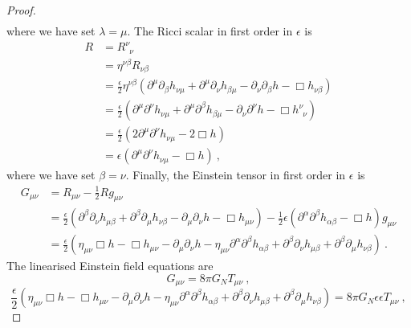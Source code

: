 \begin{proof}
\begin{equation*}
\begin{aligned}
        \end{aligned}
        \end{equation*}
        where we have set $\lambda = \mu$.
        The Ricci scalar in first order in $\epsilon$ is 
        \begin{equation*}
        \begin{aligned}
            R & = R^\nu_{\phantom \nu \nu} \\ & = \eta^{\nu \beta} R_{\nu \beta} \\ & = \frac{\epsilon}{2} \eta^{\nu \beta} ( \partial^\mu \partial_\beta h_{\nu\mu} + \partial^\mu \partial_\nu h_{\beta\mu} - \partial_\nu \partial_\beta h - \Box h_{\nu\beta}) \\ & = \frac{\epsilon}{2} ( \partial^\mu \partial^\nu h_{\nu\mu} + \partial^\mu \partial^\beta h_{\beta\mu} - \partial_\nu \partial^\nu h - \Box h^\nu_{\phantom \nu \nu}) \\ & = \frac{\epsilon}{2} (2 \partial^\mu \partial^\nu h_{\nu\mu} - 2 \Box h) \\ & = \epsilon (\partial^\mu \partial^\nu h_{\nu\mu}- \Box h) ~,
        \end{aligned}
        \end{equation*}
        where we have set $\beta = \nu$.
        Finally, the Einstein tensor in first order in $\epsilon$ is 
        \begin{equation*} 
        \begin{aligned}
            G_{\mu\nu} & = R_{\mu\nu} - \frac{1}{2} R g_{\mu\nu} \\ & = \frac{\epsilon}{2} (\partial^\beta \partial_\nu h_{\mu\beta} + \partial^\beta \partial_\mu h_{\nu\beta} - \partial_\mu \partial_\nu h - \Box h_{\mu\nu} ) - \frac{1}{2} \epsilon (\partial^\alpha \partial^\beta h_{\alpha\beta } - \Box h ) g_{\mu\nu} \\ & = \frac{\epsilon}{2} ( \eta_{\mu\nu} \Box h - \Box h_{\mu\nu} - \partial_\mu \partial_\nu h - \eta_{\mu\nu} \partial^\alpha \partial^\beta h_{\alpha\beta} + \partial^\beta \partial_\nu h_{\mu\beta} + \partial^\beta \partial_\mu h_{\nu\beta} ) ~.
        \end{aligned}
        \end{equation*}
        The linearised Einstein field equations are 
        \begin{equation*}
            G_{\mu\nu} = 8 \pi G_N T_{\mu\nu} ~,
        \end{equation*}
        \begin{equation*}
            \frac{\epsilon}{2} ( \eta_{\mu\nu} \Box h - \Box h_{\mu\nu} - \partial_\mu \partial_\nu h - \eta_{\mu\nu} \partial^\alpha \partial^\beta h_{\alpha\beta}  + \partial^\beta \partial_\nu h_{\mu\beta} + \partial^\beta \partial_\mu h_{\nu\beta} ) = 8 \pi G_N \epsilon \epsilon T_{\mu\nu} ~,

\end{equation*}
\end{proof}
